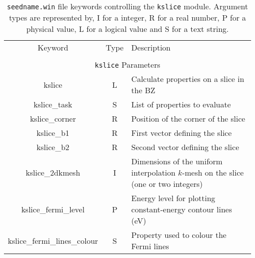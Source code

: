 \begin{table}[hH!]
\begin{center}
\begin{tabular}{|c|c|p{6cm}|}
  \hline
  Keyword & Type & Description \\
  &      &             \\
  \hline\hline
  \multicolumn{3}{|c|}{{\tt kslice} Parameters} \\
  \hline
  {\sc kslice}  & L & Calculate properties on a slice in the BZ \\
  {\sc kslice\_task}& S & List of properties to evaluate\\
  {\sc kslice\_corner}& R & Position of the corner of the slice\\
  {\sc kslice\_b1}& R & First vector defining the slice\\
  {\sc kslice\_b2}& R & Second vector defining the slice\\
  {\sc kslice\_2dkmesh}& I & Dimensions of the uniform interpolation 
  $k$-mesh on the slice (one or two integers)\\
  {\sc kslice\_fermi\_level}& P & Energy level for  plotting 
  constant-energy contour lines (eV)\\
  {\sc kslice\_fermi\_lines\_colour}& S & Property used to colour the Fermi 
  lines\\
  \hline
\end{tabular}
\caption[Parameter file keywords controlling the kslice module.]
{{\tt seedname.win} file keywords controlling the {\tt kslice}
  module. Argument types are represented by, I for a integer, R for a
  real number, P for a physical value, L for a logical value and S for
  a text string.}
\label{parameter_keywords_kslice}
\end{center}
\end{table}



